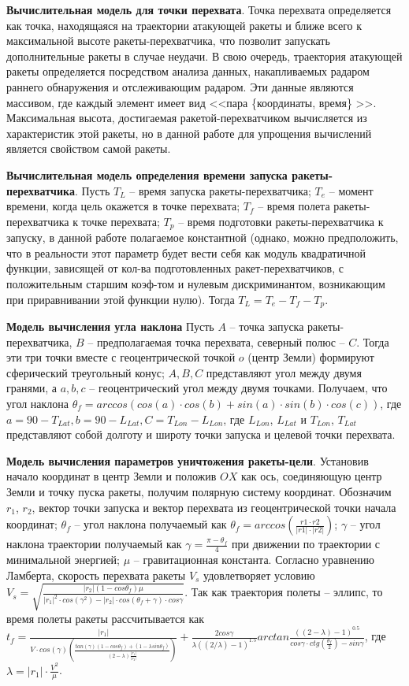 \textbf{Вычислительная модель для точки перехвата}.
Точка перехвата определяется как точка, находящаяся на траектории атакующей ракеты и ближе всего к максимальной высоте ракеты-перехватчика, что позволит запускать дополнительные ракеты в случае неудачи. В свою очередь, траектория атакующей ракеты определяется посредством анализа данных, накапливаемых радаром раннего обнаружения и отслеживающим радаром. Эти данные являются массивом, где каждый элемент имеет вид  <<пара \{координаты, время\} >>.  Максимальная высота, достигаемая ракетой-перехватчиком вычисляется из характеристик этой ракеты, но в данной работе для упрощения вычислений является свойством самой ракеты.

\textbf{Вычислительная модель определения времени запуска ракеты-перехватчика}.
Пусть $T_L$ -- время запуска ракеты-перехватчика; $T_e$ -- момент времени, когда цель окажется в точке перехвата; $T_f$ -- время полета ракеты-перехватчика к точке перехвата; $T_p$ -- время подготовки ракеты-перехватчика к запуску, в данной работе полагаемое константной (однако, можно предположить, что в реальности этот параметр будет вести себя как  модуль квадратичной функции, зависящей от кол-ва подготовленных ракет-перехватчиков, с положительным старшим коэф-том и нулевым дискриминантом, возникающим при приравнивании этой функции нулю). Тогда $T_L = T_e - T_f - T_p$.

\textbf{Модель вычисления угла наклона}
Пусть $A$ -- точка запуска ракеты-перехватчика, $B$ -- предполагаемая точка перехвата, северный полюс --  $C$. Тогда эти три точки вместе с геоцентрической точкой $o$ (центр Земли) формируют сферический треугольный конус; $A, B, C$ представляют угол между двумя гранями, а $a,b,c$  -- геоцентрический угол между двумя точками. Получаем, что угол наклона $\theta_f=arccos(cos(a) \cdot cos(b)+sin(a) \cdot sin(b) \cdot cos(c))$, где 
$a=90-T_{Lat}, b=90-L_{Lat}, C=T_{Lon}-L_{Lon}$, где $L_{Lon}$, $L_{Lat}$ и  $T_{Lon}$, $T_{Lat}$ представляют собой долготу и широту точки запуска и целевой точки перехвата.

\textbf{Модель вычисления параметров уничтожения ракеты-цели}.
Установив начало координат в центр Земли и положив $OX$ как ось, соединяющую центр Земли и точку пуска ракеты, получим полярную систему координат. Обозначим $r_1$, $r_2$, вектор точки запуска и вектор перехвата из геоцентрической точки начала координат; $\theta_f$ -- угол наклона получаемый как $\theta_f = arccos(\frac{r1 \cdot r2}{|r1| \cdot |r2|})$; $\gamma$ -- угол наклона траектории получаемый как $\gamma = \frac{\pi - \theta_f}{4}$ при движении по траектории с минимальной энергией; $\mu$ -- гравитационная константа.    Согласно уравнению Ламберта, скорость перехвата ракеты $V_s$ удовлетворяет условию 
$V_s = \sqrt{\frac{|r_2|(1-cos \theta_f)\mu}{|r_1|^2 \cdot cos(\gamma ^ 2) - |r_2| \cdot  cos(\theta_f + \gamma) \cdot cos \gamma}}$.
Так как траектория полеты -- эллипс, то время полеты ракеты рассчитывается как
$t_f = \frac{|r_1|}{V \cdot cos(\gamma) (\frac{tan(\gamma) (1-cos \theta_f) + (1-\lambda sin \theta_f)}{(2-\lambda)  \frac{|r_1|}{|r_2|}})} + \frac{2cos \gamma}{\lambda ((2/ \lambda) - 1)^{1.5}} arctan \frac{((2-\lambda) - 1) ^ {0.5}}{cos \gamma \cdot ctg(\frac{\theta_f}{2}) - sin \gamma}$, где $\lambda = |r_1| \cdot \frac{V^2}{\mu} $. 


